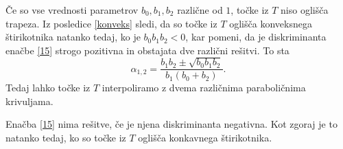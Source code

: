 \documentclass[mat1]{fmfdelo}
\newcommand{\al}{\alpha}
\begin{document}
\begin{dokaz}
%
%

Če so vse vrednosti parametrov $b_0, b_1, b_2$ različne od $1$, točke iz $T$ niso oglišča trapeza. Iz posledice \ref{konveks} sledi, da so točke iz $T$ oglišča konveksnega štirikotnika natanko tedaj, ko je $b_0 b_1 b_2 < 0$, kar pomeni, da je diskriminanta enačbe \eqref{15} strogo pozitivna in obstajata dve različni rešitvi. To sta
\begin{equation*}
\al_{1,2} = \frac{b_1 b_2 \pm \sqrt{b_0 b_1 b_2}}{b_1 ( b_0 + b_2)}.
\end{equation*}
Tedaj lahko točke iz $T$ interpoliramo z dvema različnima paraboličnima krivuljama.

Enačba \eqref{15} nima rešitve, če je njena diskriminanta negativna. Kot zgoraj je to natanko tedaj, ko so točke iz $T$ oglišča konkavnega štirikotnika.
\end{dokaz}
\end{document}
